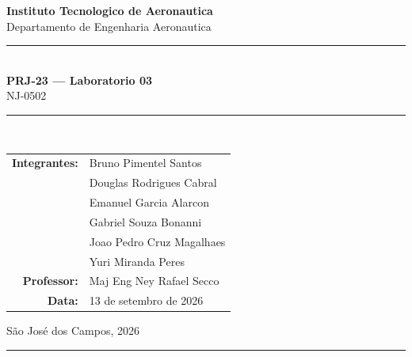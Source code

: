 \documentclass[11pt,a4paper]{article}
\begin{document}
\begin{titlepage}
  \centering
  \vspace*{1cm}

  {\Large \textbf{Instituto Tecnologico de Aeronautica}} \\[0.4cm]
  {\large Departamento de Engenharia Aeronautica} \\[1.5cm]

  \rule{\linewidth}{1pt} \\[0.4cm]
  {\LARGE \textbf{PRJ-23 --- Laboratorio 03}} \\[0.3cm]
  {\Large NJ-0502} \\[0.3cm]
  \rule{\linewidth}{1pt} \\[2cm]

  \begin{tabular}{rl}
    \textbf{Integrantes:}  & Bruno Pimentel Santos \\
                           & Douglas Rodrigues Cabral \\
                           & Emanuel Garcia Alarcon \\
                           & Gabriel Souza Bonanni \\
                           & Joao Pedro Cruz Magalhaes \\
                           & Yuri Miranda Peres \\[0.6cm]
    \textbf{Professor:}    & Maj Eng Ney Rafael Secco \\[0.6cm]
    \textbf{Data:}         & 13 de setembro de 2026 \\
  \end{tabular}

  \vfill
  {\small São José dos Campos, 2026}
\end{titlepage}

\newpage

\begin{abstract}
\noindent
Este documento e um modelo de relatorio para o Laboratorio 03 de PRJ-23.
O texto foi estruturado no mesmo estilo adotado nos Labs 01 e 02, com uma
introducao geral, seccoes separadas por etapa do trabalho, espacos para
figuras, tabelas e discussoes, e uma conclusao final. O modelo esta
organizado para receber os resultados das etapas de parametrizacao do
perfil, analise com o XFOIL e analise/otimizacao com o Euler solver.
\end{abstract}

\vspace{0.3cm}
\hrule
\vspace{0.5cm}






\end{document}
